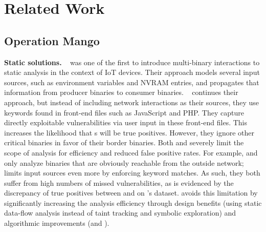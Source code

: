 \chapter{Related Work}
\label{ch:related-work}



\section{Operation Mango}
\label{sec:related}

\noindent
\textbf{Static solutions.}
\karonte~\cite{karonte} was one of the first to introduce multi-binary interactions to static analysis in the context of IoT devices.
Their approach models several input sources, such as environment variables and NVRAM entries, and propagates that information from producer binaries to consumer binaries.
\satc~\cite{SaTC} continues their approach, but instead of including network interactions as their sources, they use keywords found in front-end files such as JavaScript and PHP.
They capture directly exploitable vulnerabilities via user input in these front-end files.
This increases the likelihood that \trupoc{}s will be true positives.
However, they ignore other critical binaries in favor of their border binaries.
Both \karonte and \satc severely limit the scope of analysis for efficiency and reduced false positive rates.
For example, \karonte and \satc only analyze binaries that are obviously reachable from the outside network; \satc limits input sources even more by enforcing keyword matches.
As such, they both suffer from high numbers of missed vulnerabilities, as is evidenced by the discrepancy of true positives between \mango and \satc on \karonte's dataset.
\mango avoids this limitation by significantly increasing the analysis efficiency through design benefits (using static data-flow analysis instead of taint tracking and symbolic exploration) and algorithmic improvements (\rev and \assumed).

